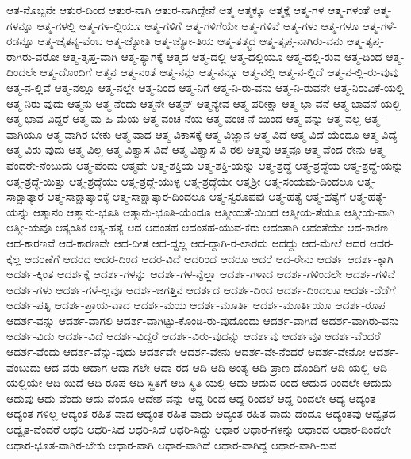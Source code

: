 {ಆತ-ನೊಬ್ಬನೇ
ಆತುರ-ದಿಂದ
ಆತುರ-ನಾಗಿ
ಆತುರ-ನಾಗಿದ್ದೇನೆ
ಆತ್ಮ
ಆತ್ಮಕ್ಕೂ
ಆತ್ಮಕ್ಕೆ
ಆತ್ಮ-ಗಳ
ಆತ್ಮ-ಗಳಂತೆ
ಆತ್ಮ-ಗಳನ್ನೂ
ಆತ್ಮ-ಗಳಲ್ಲಿ
ಆತ್ಮ-ಗಳ-ಲ್ಲಿಯೂ
ಆತ್ಮ-ಗಳಿಗೆ
ಆತ್ಮ-ಗಳಿಗೆಯೇ
ಆತ್ಮ-ಗಳಿವೆ
ಆತ್ಮ-ಗಳು
ಆತ್ಮ-ಗಳೂ
ಆತ್ಮ-ಗಳೆ-ರಡನ್ನೂ
ಆತ್ಮ-ಚೈತನ್ಯ-ವೆಂಬ
ಆತ್ಮ-ಜ್ಯೋತಿ
ಆತ್ಮ-ಜ್ಯೋ-ತಿಯ
ಆತ್ಮ-ತತ್ತ್ವದ
ಆತ್ಮ-ತೃಪ್ತ-ನಾಗಿರು-ವನು
ಆತ್ಮ-ತೃಪ್ತ-ರಾಗಿರು-ವರೋ
ಆತ್ಮ-ತೃಪ್ತ-ವಾಗಿ
ಆತ್ಮ-ತ್ಯಾಗಕ್ಕೆ
ಆತ್ಮದ
ಆತ್ಮ-ದಲ್ಲಿ
ಆತ್ಮ-ದಲ್ಲಿಯೂ
ಆತ್ಮ-ದಲ್ಲಿ-ರುವ
ಆತ್ಮ-ದಿಂದ
ಆತ್ಮ-ದಿಂದಲೇ
ಆತ್ಮ-ದೊಂದಿಗೆ
ಆತ್ಮನ
ಆತ್ಮ-ನಂತೆ
ಆತ್ಮ-ನನ್ನು
ಆತ್ಮ-ನನ್ನೂ
ಆತ್ಮ-ನಲ್ಲಿ
ಆತ್ಮ-ನ-ಲ್ಲಿದೆ
ಆತ್ಮ-ನ-ಲ್ಲಿ-ರು-ವುವು
ಆತ್ಮ-ನ-ಲ್ಲಿವೆ
ಆತ್ಮ-ನಲ್ಲೂ
ಆತ್ಮ-ನಲ್ಲೇ
ಆತ್ಮ-ನಿಂದ
ಆತ್ಮ-ನಿಗೆ
ಆತ್ಮ-ನಿ-ರು-ವನು
ಆತ್ಮ-ನಿ-ರುವನೇ
ಆತ್ಮ-ನಿರುವಿಕೆ-ಯಲ್ಲಿ
ಆತ್ಮ-ನಿರು-ವುದು
ಆತ್ಮನು
ಆತ್ಮ-ನೆಂದು
ಆತ್ಮನೇ
ಆತ್ಮನ್
ಆತ್ಮನ್ಯೇವ
ಆತ್ಮ-ಪರೀಕ್ಷಾ
ಆತ್ಮ-ಭಾ-ವನೆ
ಆತ್ಮ-ಭಾವನೆ-ಯಲ್ಲಿ
ಆತ್ಮ-ಭಾವ-ವಿದ್ದರೆ
ಆತ್ಮ-ಮ-ಹಿ-ಮೆಯ
ಆತ್ಮ-ವಂಚ-ನೆಯ
ಆತ್ಮ-ವಂಚ-ನೆ-ಯಿಂದ
ಆತ್ಮ-ವನ್ನು
ಆತ್ಮ-ವಲ್ಲ
ಆತ್ಮ-ವಾಗಿಯೂ
ಆತ್ಮ-ವಾಗಿರ-ಬೇಕು
ಆತ್ಮ-ವಾದ
ಆತ್ಮ-ವಿಕಾಸಕ್ಕೆ
ಆತ್ಮ-ವಿಜ್ಞಾನ
ಆತ್ಮ-ವಿದೆ
ಆತ್ಮ-ವಿದೆ-ಯೆಂದೂ
ಆತ್ಮ-ವಿದ್ಯೆ
ಆತ್ಮ-ವಿರು-ವುದು
ಆತ್ಮ-ವಿಲ್ಲ
ಆತ್ಮ-ವಿಶ್ವಾಸ-ವಿದೆ
ಆತ್ಮ-ವಿಶ್ವಾಸ-ವಿ-ರಲಿ
ಆತ್ಮವು
ಆತ್ಮವೂ
ಆತ್ಮ-ವೆಂದ-ರೇನು
ಆತ್ಮ-ವೆಂದರೇ-ನೆಂಬುದು
ಆತ್ಮ-ವೆಂದು
ಆತ್ಮವೇ
ಆತ್ಮ-ಶಕ್ತಿಯ
ಆತ್ಮ-ಶಕ್ತಿ-ಯನ್ನು
ಆತ್ಮ-ಶ್ರದ್ಧೆ
ಆತ್ಮ-ಶ್ರದ್ಧೆಯ
ಆತ್ಮ-ಶ್ರದ್ಧೆ-ಯನ್ನು
ಆತ್ಮ-ಶ್ರದ್ಧೆ-ಯಿತ್ತು
ಆತ್ಮ-ಶ್ರದ್ಧೆಯು
ಆತ್ಮ-ಶ್ರದ್ಧೆ-ಯುಳ್ಳ
ಆತ್ಮ-ಶ್ರದ್ಧೆಯೇ
ಆತ್ಮಶ್ರೀ
ಆತ್ಮ-ಸಂಯಮ-ದಿಂದಲೂ
ಆತ್ಮ-ಸಾಕ್ಷಾತ್ಕಾರ
ಆತ್ಮ-ಸಾಕ್ಷಾತ್ಕಾರಕ್ಕೆ
ಆತ್ಮ-ಸಾಕ್ಷಾತ್ಕಾರ-ದಿಂದಲೂ
ಆತ್ಮ-ಸ್ವರೂಪವು
ಆತ್ಮ-ಹತ್ಯೆ
ಆತ್ಮ-ಹತ್ಯೆಗೆ
ಆತ್ಮ-ಹತ್ಯೆ-ಯನ್ನು
ಆತ್ಮಾನಂ
ಆತ್ಮಾನು-ಭೂತಿ
ಆತ್ಮಾನು-ಭೂತಿ-ಯೆಂದೂ
ಆತ್ಮೀಯತೆ-ಯಿಂದ
ಆತ್ಮೀಯ-ತೆಯೂ
ಆತ್ಮೀಯ-ವಾಗಿ
ಆತ್ಮೀ-ಯವೂ
ಆತ್ಯಂತಿಕ
ಆತ್ಯ-ಹತ್ಯೆ
ಆದ
ಆದಂತಹ
ಆದಂತಹ-ಯುವ-ಕರು
ಆದಂತಾಗಿ
ಆದಂತೆಯೇ
ಆದ-ಕಾರಣ
ಆದ-ಕಾರಣವೆ
ಆದ-ಕಾರಣವೇ
ಆದ-ದೀತ
ಆದ-ದ್ದಲ್ಲ
ಆದ-ದ್ದಾಗಿ-ರ-ಲಾರದು
ಆದದ್ದು
ಆದ-ಮೇಲೆ
ಆದರ
ಆದರ-ಕ್ಕೆಲ್ಲ
ಆದರಣೆಗೆ
ಆದರದ
ಆದರ-ದಿಂದ
ಆದರ-ವಿದೆ
ಆದರಿಂದ
ಆದರೂ
ಆದರೆ
ಆದ-ರೇನು
ಆದರ್ಶ
ಆದರ್ಶ-ಕ್ಕಾಗಿ
ಆದರ್ಶ-ಕ್ಕಿಂತ
ಆದರ್ಶಕ್ಕೆ
ಆದರ್ಶ-ಗಳನ್ನು
ಆದರ್ಶ-ಗಳ-ನ್ನೆಲ್ಲಾ
ಆದರ್ಶ-ಗಳಾದ
ಆದರ್ಶ-ಗಳಿಂದಲೇ
ಆದರ್ಶ-ಗಳಿವೆ
ಆದರ್ಶ-ಗಳು
ಆದರ್ಶ-ಗಳೆ-ಲ್ಲವೂ
ಆದರ್ಶ-ಜಗತ್ತಿನ
ಆದರ್ಶದ
ಆದರ್ಶ-ದಿಂದ
ಆದರ್ಶ-ದಿಂದಲೂ
ಆದರ್ಶ-ದೆಡೆಗೆ
ಆದರ್ಶ-ಪತ್ನಿ
ಆದರ್ಶ-ಪ್ರಾಯ-ವಾದ
ಆದರ್ಶ-ಮಯ
ಆದರ್ಶ-ಮೂರ್ತಿ
ಆದರ್ಶ-ಮೂರ್ತಿಯೂ
ಆದರ್ಶ-ರೂಪ
ಆದರ್ಶ-ವನ್ನು
ಆದರ್ಶ-ವಾಗಲಿ
ಆದರ್ಶ-ವಾಗಿಟ್ಟು-ಕೊಂಡಿ-ರು-ವುದೊಂದು
ಆದರ್ಶ-ವಾಗಿದೆ
ಆದರ್ಶ-ವಾಗಿರು-ವನು
ಆದರ್ಶ-ವಿದು
ಆದರ್ಶ-ವಿದೆ
ಆದರ್ಶ-ವಿದ್ದರೆ
ಆದರ್ಶ-ವಿರು-ವುದನ್ನು
ಆದರ್ಶವು
ಆದರ್ಶವೂ
ಆದರ್ಶ-ವೆಂದರೆ
ಆದರ್ಶ-ವೆಂದು
ಆದರ್ಶ-ವೆನ್ನು-ವುದು
ಆದರ್ಶವೇ
ಆದರ್ಶ-ವೇನು
ಆದರ್ಶ-ವೇ-ನೆಂದರೆ
ಆದರ್ಶ-ವೇನೋ
ಆದರ್ಶ-ವೆಂಬುದು
ಆದ-ವರು
ಆದಾಗ
ಆದಾ-ಗಲೇ
ಆದಾ-ರದ
ಆದಿ
ಆದಿ-ಅಂತ್ಯ
ಆದಿ-ಪ್ರಾಣ-ದೊಂದಿಗೆ
ಆದಿ-ಯಲ್ಲಿ
ಆದಿ-ಯಲ್ಲಿಯೇ
ಆದಿ-ಯಿದೆ
ಆದಿ-ರೂಪ
ಆದಿ-ಸ್ಥಿತಿಗೆ
ಆದಿ-ಸ್ಥಿತಿ-ಯಲ್ಲಿ
ಆದು
ಆದುದ-ರಿಂದ
ಆದುದ-ರಿಂದಲೇ
ಆದುದು
ಆದುವು
ಆದು-ವೆಂದು
ಆದು-ವೆಂದೂ
ಆದೇಶ-ವನ್ನು
ಆದ್ದ-ರಿಂದ
ಆದ್ದ-ರಿಂದಲೆ
ಆದ್ದ-ರಿಂದಲೇ
ಆದ್ಯ
ಆದ್ಯಂತ
ಆದ್ಯಂತ-ಗಳಿಲ್ಲ
ಆದ್ಯಂತ-ರಹಿತ-ವಾದ
ಆದ್ಯಂತ-ರಹಿತ-ವಾದು
ಆದ್ಯಂತ-ರಹಿತ-ವಾದು-ದೆಂದೂ
ಆದ್ಯಂತವು
ಆದ್ವೈತದ
ಆದ್ವೈತ-ವೆಂದರೆ
ಆಧರಿ
ಆಧರಿ-ಸಿದ
ಆಧರಿ-ಸಿದೆ
ಆಧರಿ-ಸಿದ್ದು
ಆಧಾರ
ಆಧಾರ-ಗಳನ್ನು
ಆಧಾರದ
ಆಧಾರ-ದಿಂದಲೇ
ಆಧಾರ-ಭೂತ-ವಾಗಿರ-ಬೇಕು
ಆಧಾರ-ವಾಗಿ
ಆಧಾರ-ವಾಗಿದೆ
ಆಧಾರ-ವಾಗಿದ್ದ
ಆಧಾರ-ವಾಗಿ-ರುವ
}
